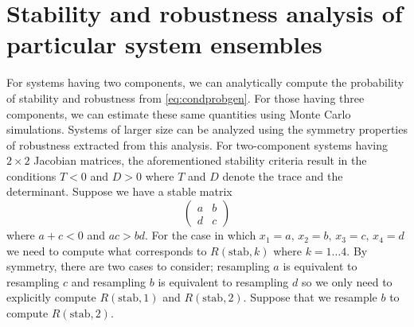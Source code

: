 \section{Stability and robustness analysis of particular system ensembles}
For systems having two components, we can analytically compute the probability of stability and robustness from \ref{eq:condprobgen}. For those having three components, we can estimate these same quantities using Monte Carlo simulations. Systems of larger size can be analyzed using the symmetry properties of robustness extracted from this analysis. For two-component systems having $2 \times 2$ Jacobian matrices, the aforementioned stability criteria result in the conditions $T < 0$ and $D >
0$ where $T$ and $D$ denote the trace and the determinant. Suppose we have a stable matrix
$$
\begin{pmatrix}
a & b \\
d & c
\end{pmatrix}
$$
where $a + c < 0$ and $ac > bd$.  For the case in which $x_1=a,\,x_2=b,\,x_3=c,\,x_4=d$ we need to compute what corresponds to $R(\mathrm{stab},k)$ where $k=1 \ldots 4$. By symmetry, there are two cases to consider; resampling $a$ is equivalent to resampling $c$ and resampling $b$ is equivalent to resampling $d$ so we only need to explicitly compute $R(\mathrm{stab},1)$ and $R(\mathrm{stab},2)$. Suppose that we resample $b$ to compute $R(\mathrm{stab},2)$.
